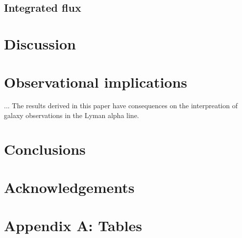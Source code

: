\documentclass[usenatbib]{mn2e}
\begin{document}
\subsection{Integrated flux}


\section{Discussion}
\label{sec:discussion}

\section{Observational implications}

... The results derived in this paper have consequences on the
interpreation of galaxy observations in the Lyman alpha line.

\section{Conclusions}

\section*{Acknowledgements}

\section*{Appendix A: Tables}
\end{document}
